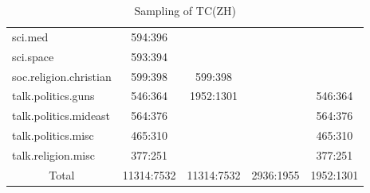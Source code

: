\begin{table}[h]
\begin{minipage}{\textwidth}
\begin{subtable}{0.58\textwidth}
{\begin{tabular}{|l|c|c|c|c|}
	sci.med                       & 594:396    &                            &           &           \\ \cline{1-2} \cline{4-5} 
	sci.space                     & 593:394    &                            &           &           \\ \hline
	soc.religion.christian        & 599:398    & 599:398                    &           &           \\ \hline
	talk.politics.guns            & 546:364    & \multirow{4}{*}{1952:1301} &           & 546:364   \\ \cline{1-2} \cline{4-5}
	talk.politics.mideast         & 564:376    &                            &           & 564:376   \\ \cline{1-2} \cline{4-5}
	talk.politics.misc            & 465:310    &                            &           & 465:310   \\ \cline{1-2} \cline{4-5}
	talk.religion.misc            & 377:251    &                            &           & 377:251   \\ \hline
	\multicolumn{1}{|c|}{Total}   & 11314:7532 & 11314:7532                 & 2936:1955 & 1952:1301 \\ \hline
\end{tabular}}
\end{subtable}
\begin{subtable}{0.42\textwidth}
\centering
\caption{Sampling of TC(ZH)}
\end{subtable}
\end{minipage}
\end{table}

